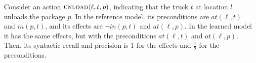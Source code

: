 \begin{example}
Consider an action $\textsc{unload}(\ell, t, p)$, indicating that the truck $t$ at location $l$ unloads the package $p$. 
In the reference model, its preconditions are $\textit{at}(\ell, t)$ and $\textit{in}(p,t)$, and its effects are $\neg \textit{in}(p,t)$ and $\textit{at}(\ell,p)$.
In the learned model it has the same effects, but with the preconditions $\textit{at}(\ell, t)$ and $\textit{at}(\ell, p)$. 
Then, its syntactic recall and precision is $1$ for the effects and $\frac 1 2$ for the preconditions. 
\end{example}
